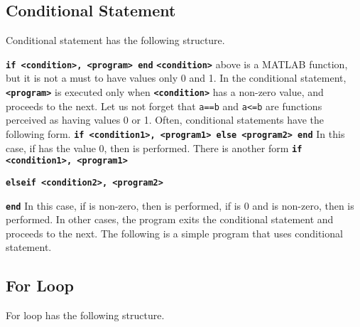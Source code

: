 \subsection{Conditional Statement}
Conditional statement has the following structure. \vv

\texttt{\textbf{if <condition>, <program> end}} \vn \texttt{\textbf{<condition>}} above is a MATLAB function, but it is not a must to have values only 0 and 1. In the conditional statement, \texttt{\textbf{<program>}} is executed only when \texttt{\textbf{<condition>}} has a non-zero value, and proceeds to the next. Let us not forget that {\tt a==b} and {\tt a<=b} are functions perceived as having values 0 or 1. Often, conditional statements have the following form. \vv \texttt{\textbf{if <condition1>, <program1> else <program2> end}} \vn In this case, if {\tt <condition1>} has the value 0, then {\tt <program2>} is performed. There is another form \vv \texttt{\textbf{if <condition1>, <program1>}} \par \texttt{\textbf{elseif <condition2>, <program2>}} \par \texttt{\textbf{end}} In this case, if {\tt <condition1>} is non-zero, then {\tt <program1>} is performed, if {\tt <condition1>} is 0 and {\tt <condition2>} is non-zero, then {\tt <program2>} is performed. In other cases, the program exits the conditional statement and proceeds to the next. The following is a simple program that uses conditional statement. \vv
\begin{center}
\end{center}

\subsection{For Loop}
For loop has the following structure.

